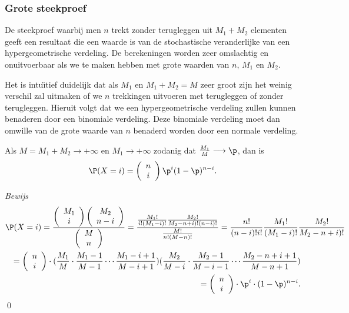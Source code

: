 {\newpage
\subsubsection{Grote steekproef}
De steekproef waarbij men $n$ trekt zonder terugleggen uit $M_1+M_2$ 
elementen geeft een resultaat die een waarde is van de stochastische 
veranderlijke van een hypergeometrische 
verdeling. De berekeningen worden zeer omslachtig en onuitvoerbaar
als we te maken hebben met grote waarden van $n$, $M_1$ en $M_2$.

Het is intu\"\i tief duidelijk dat als $M_1$ en $M_1+M_2=M$ zeer groot zijn het
weinig verschil zal uitmaken of we $n$ trekkingen uitvoeren met terugleggen of 
zonder terugleggen. Hieruit volgt dat we een hypergeometrische verdeling 
zullen kunnen benaderen door een binomiale verdeling. Deze binomiale verdeling 
moet dan omwille van de grote waarde van $n$ benaderd worden door een normale 
verdeling.

\begin{stel}
Als $M=M_1+M_2\longrightarrow +\infty$ en $M_1\longrightarrow +\infty$ zodanig 
dat $\frac{M_1}{M}\longrightarrow \p$, dan is
$$\P(X=i)=\left(\begin{array}{c}
n\\
i
\end{array}\right) \p^i (1-\p)^{n-i}.$$
\end{stel}

{\em Bewijs}
\begin{eqnarray*}
\lefteqn{\P(X=i) = \frac{\left(\begin{array}{c}
M_1\\
i
\end{array}
\right)
\left(\begin{array}{c}
M_2\\
n-i
\end{array}
\right)}
{\left(\begin{array}{c}
M\\
n
\end{array}
\right)}= \frac{\frac{M_1!}{i!(M_1-i)!}\frac{M_2!}{M_2-n+i)!(n-i)!}}
{\frac{M!}{n!(M-n)!}}=\frac{n!}{(n-i)!i!}\frac{M_1!}{(M_1-i)!}\frac{M_2!}{M_2-n+i)!}}
\\
 &  & =\left(\begin{array}{c}
n\\
i
\end{array}
\right)\cdot
(\frac{M_1}{M}\cdot\frac{M_1-1}{M-1}\cdots\frac{M_1-i+1}{M-i+1})
(\frac{M_2}{M-i}\cdot\frac{M_2-1}{M-i-1}\cdots\frac{M_2-n+i+1}{M-n+1})\\
 & & = 
\left(\begin{array}{c}
n\\
i
\end{array}
\right)\cdot\p^i\cdot (1-\p)^{n-i}.
\end{eqnarray*}
\qed

}

